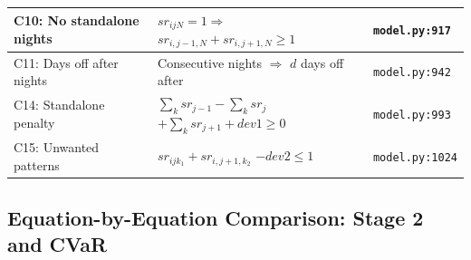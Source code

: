 \documentclass[12pt,a4paper]{article}
\begin{document}
\begin{longtable}{|p{4cm}|p{5cm}|p{5cm}|}
\hline
C10: No standalone nights & $sr_{ijN}=1 \Rightarrow$ \newline $sr_{i,j-1,N}+sr_{i,j+1,N}\geq 1$ & \texttt{model.py:917} \\
\hline
C11: Days off after nights & Consecutive nights $\Rightarrow$ \newline $d$ days off after & \texttt{model.py:942} \\
\hline
C14: Standalone penalty & $\sum_k sr_{j-1} - \sum_k sr_j$ \newline $+ \sum_k sr_{j+1} + dev1 \geq 0$ & \texttt{model.py:993} \\
\hline
C15: Unwanted patterns & $sr_{ijk_1} + sr_{i,j+1,k_2}$ \newline $- dev2 \leq 1$ & \texttt{model.py:1024} \\
\hline
\end{longtable}

\subsection{Equation-by-Equation Comparison: Stage 2 and CVaR}
\end{document}
